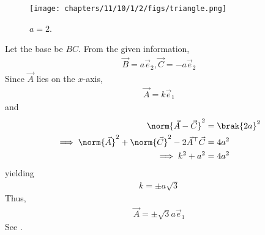	\begin{figure}[H]
		\centering
 \texttt{[image: chapters/11/10/1/2/figs/triangle.png]}
		\caption{$a = 2$.}
		\label{fig:11/10/1/2}
  	\end{figure}
	Let the base be $BC$.  From the given information, 
\begin{align}
	\vec{B} = a\vec{e}_2,
	\vec{C} = -a\vec{e}_2
\end{align}
Since $\vec{A}$ lies on the $x$-axis, 
\begin{align}
	\vec{A} = k\vec{e}_1
\end{align}
and 
\begin{align}
	\norm{\vec{A}-\vec{C}}^2 &= \brak{2a}^2
	\\
	\implies \norm{\vec{A}}^2+\norm{\vec{C}}^2 - 2 \vec{A}^{\top}\vec{C} &= 4a^2
	\\
	\implies k^2 +a^2 &= 4a^2
\end{align}
yielding
\begin{align}
 k = \pm a\sqrt{3}
\end{align}
Thus, 
\begin{align}
	\vec{A} = \pm \sqrt{3}a\vec{e}_1
\end{align}
		See .

